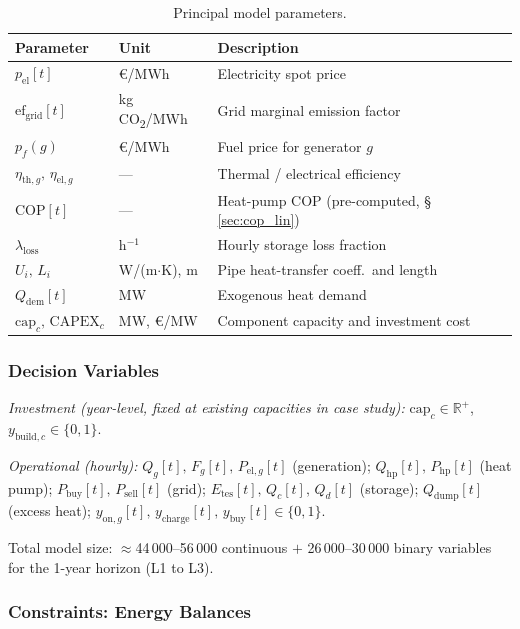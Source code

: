 \documentclass[a4paper,fleqn]{cas-sc}
\newcommand{\Qhp}{Q_{\mathrm{hp}}}
\newcommand{\Php}{P_{\mathrm{hp}}}
\newcommand{\Etes}{E_{\mathrm{tes}}}
\newcommand{\COP}{\mathrm{COP}}
\begin{document}
\begin{table}
\caption{Principal model parameters.}
\label{tab:params}
\begin{tabularx}{\linewidth}{llX}
\toprule
Parameter & Unit & Description \\
\midrule
$p_{\mathrm{el}}[t]$ & \euro/MWh & Electricity spot price \\
$\mathrm{ef}_{\mathrm{grid}}[t]$ & kg\,CO\textsubscript{2}/MWh & Grid marginal emission factor \\
$p_f(g)$ & \euro/MWh & Fuel price for generator $g$ \\
$\eta_{\mathrm{th},g},\,\eta_{\mathrm{el},g}$ & --- & Thermal / electrical efficiency \\
$\COP[t]$ & --- & Heat-pump COP (pre-computed, \S\,\ref{sec:cop_lin}) \\
$\lambda_{\mathrm{loss}}$ & h$^{-1}$ & Hourly storage loss fraction \\
$U_i,\,L_i$ & W/(m$\cdot$K), m & Pipe heat-transfer coeff.\ and length \\
$Q_{\mathrm{dem}}[t]$ & MW & Exogenous heat demand \\
$\mathrm{cap}_c,\,\mathrm{CAPEX}_c$ & MW, \euro/MW & Component capacity and investment cost \\
\bottomrule
\end{tabularx}
\end{table}

\subsubsection{Decision Variables}

\emph{Investment (year-level, fixed at existing capacities in case study):}
$\mathrm{cap}_c \in \mathbb{R}^+$, $y_{\mathrm{build},c} \in \{0,1\}$.

\emph{Operational (hourly):}
$Q_g[t],\,F_g[t],\,P_{\mathrm{el},g}[t]$ (generation);
$\Qhp[t],\,\Php[t]$ (heat pump);
$P_{\mathrm{buy}}[t],\,P_{\mathrm{sell}}[t]$ (grid);
$\Etes[t],\,Q_c[t],\,Q_d[t]$ (storage);
$Q_{\mathrm{dump}}[t]$ (excess heat);
$y_{\mathrm{on},g}[t],\,y_{\mathrm{charge}}[t],\,y_{\mathrm{buy}}[t] \in \{0,1\}$.

Total model size: $\approx$44\,000--56\,000 continuous $+$ 26\,000--30\,000 binary
variables for the 1-year horizon (L1 to L3).

\subsubsection{Constraints: Energy Balances}
\end{document}
